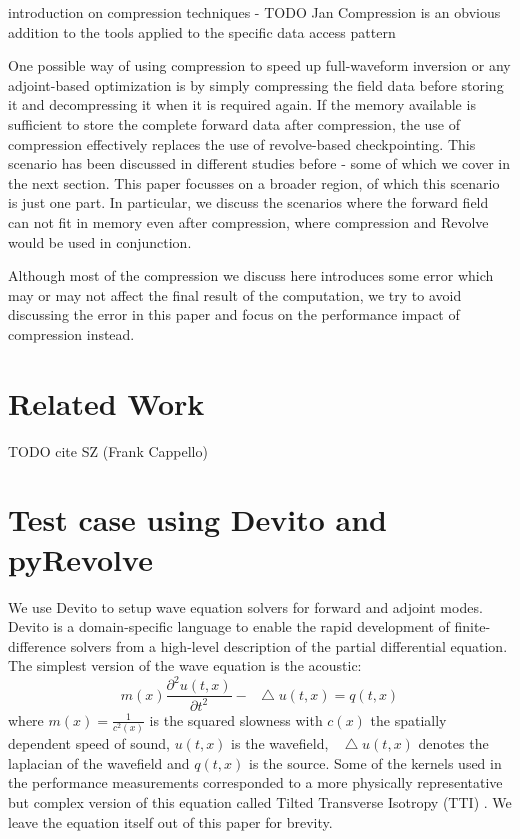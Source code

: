 \documentclass[conference]{IEEEtran}
\newcommand*\Laplace{\mathop{}\!\mathbin\bigtriangleup}
\begin{document}
introduction on compression techniques - TODO Jan
Compression is an obvious addition to the tools applied to the specific data access pattern 


One possible way of using compression to speed up full-waveform inversion or any adjoint-based
optimization is by simply compressing the field data before storing it and decompressing it when it
is required again. If the memory available is sufficient to store the complete forward data after
compression, the use of compression effectively replaces the use of revolve-based checkpointing.
This scenario has been discussed in different studies before - some of which we cover in the next
section. This paper focusses on a broader region, of which this scenario is just one part. In particular,
we discuss the scenarios where the forward field can not fit in memory even after compression, where
compression and Revolve would be used in conjunction. 

Although most of the compression we discuss here introduces some error which may or may not affect
the final result of the computation, we try to avoid discussing the error in this paper and focus on the 
performance impact of compression instead.

\section{Related Work}
\cite{cyr2015towards}

\cite{dalmau2014lossy}

\cite{fichtner2009full}

\cite{gpu-compression}

\cite{boehm2016wavefield}
\cite{gpu-compression}
\cite{Kaklamanis:2012aa}

TODO cite SZ (Frank Cappello)
\section{Test case using Devito and pyRevolve}
We use Devito \cite{devito-compiler} \cite{devito-api} to setup wave equation solvers for forward and
adjoint modes. Devito is a domain-specific language to enable the rapid development of finite-difference
solvers from a high-level description of the partial differential equation. The simplest version of the wave
equation is the acoustic:
\begin{equation}
m(x)\frac{\partial^2 u(t, x)}{\partial t^2} - \Laplace u(t, x) = q(t, x)
\end{equation}
where $m(x) = \frac{1}{c^2(x)}$ is the squared slowness with $c(x)$ the spatially dependent speed of sound, 
$u(t, x)$ is the wavefield, $\Laplace u(t, x)$ denotes the laplacian of the wavefield and $q(t, x)$ is the source.
Some of the kernels used in the performance measurements corresponded to a more physically representative
but complex version of this equation called Tilted Transverse Isotropy (TTI) \cite{zhang2011stable}. We leave the 
equation itself out of this paper for brevity. 
\end{document}
